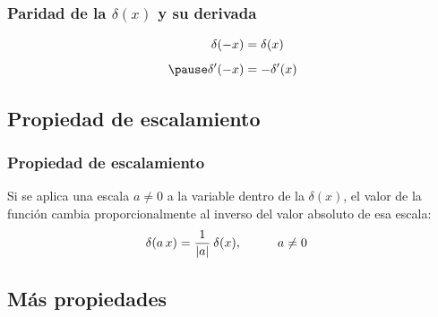 \documentclass[12pt]{beamer}
\begin{document}
\begin{frame}
\frametitle{Paridad de la $\delta (x)$ y su derivada}
\begin{eqnarray*}
\begin{aligned}
\delta (-x) &= \delta (x) \\[0.5em] \pause
\pderivada{\delta} (-x) &= - \pderivada{\delta} (x)
\end{aligned}
\end{eqnarray*}
\end{frame}

\subsection{Propiedad de escalamiento}

\begin{frame}
\frametitle{Propiedad de escalamiento}
Si se aplica una escala $a \neq 0$ a la variable dentro de la $\delta (x)$, el valor de la función cambia proporcionalmente al inverso del valor absoluto de esa escala:
\pause
\begin{align*}
\delta(a \, x) &= \dfrac{1}{\abs{a}} \: \delta (x), \hspace{1cm} a \neq 0
\end{align*}
\end{frame}

\subsection{Más propiedades}
\end{document}
